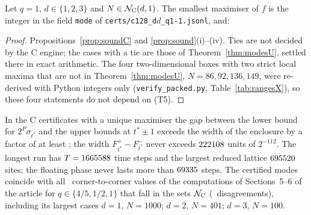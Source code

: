 \begin{theorem}[modes and multimodality for $q=1$ on the extended ranges; computer-assisted, trusted base (T5)]\label{thm:modesUX}
Let $q=1$, $d\in\{1,2,3\}$ and $N\in\mathcal N_{\rm C}(d,1)$. The smallest maximiser of $f$ is the integer in the field \texttt{mode} of \texttt{certs/c128\_d$d$\_q1-1.jsonl}, and:

\end{theorem}
\begin{proof}
Propositions~\ref{prop:soundC} and \ref{prop:sound}(i)--(iv). Ties are not decided by the C engine; the cases with a tie are those of Theorem~\ref{thm:modesU}, settled there in exact arithmetic. The four two-dimensional boxes with two strict local maxima that are not in Theorem~\ref{thm:modesU}, $N=86,92,136,149$, were re-derived with Python integers only (\texttt{verify\_packed.py}, Table~\ref{tab:rangesX}), so these four statements do not depend on (T5).
\end{proof}

\begin{table}[ht]\centering\footnotesize

\caption{Selected certified modes of the extended ranges (conventions of Tables~\ref{tab:m1}--\ref{tab:m3}; the rows $N=600$, $160$, $60$ repeat the last rows of those tables).}\label{tab:mX}
\end{table}

\begin{remark}
In the C certificates with a unique maximiser the gap between the lower bound for $2^P\sigma_{t^*}$ and the upper bounds at $t^*\pm1$ exceeds the width of the enclosure by a factor of at least \XMinMargin; the width $F^+_{t^*}-F^-_{t^*}$ never exceeds $222108$ units of $2^{-112}$. The longest run has $T=1665588$ time steps and the largest reduced lattice $695520$ sites; the floating phase never lasts more than $69335$ steps. The certified modes coincide with all \XFloatStudyAgree\ corner-to-corner values of the computations of Sections~5--6 of the article for $q\in\{4/5,1/2,1\}$ that fall in the sets $\mathcal N_{\rm C}$ (\XFloatStudyDisagree\ disagreements), including its largest cases $d=1$, $N=1000$; $d=2$, $N=401$; $d=3$, $N=100$.
\end{remark}

